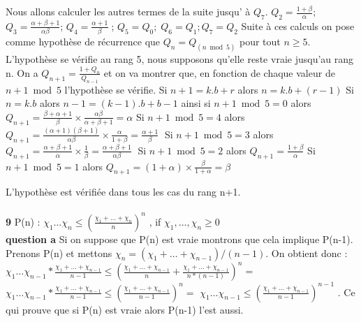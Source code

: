 \documentclass[9pt]{amsart}
\begin{document}
Nous allons calculer les autres termes de la suite jusqu' \`{a} $Q_{7}$.\newline
$Q_{2} = \frac{1+\beta}{\alpha}$;\; $Q_{3} = \frac{\alpha+\beta+1}{\alpha\beta}$;\; $Q_{4}=\frac{\alpha+1}{\beta}\;$; $Q_{5}= Q_{0};\; Q_{6} = Q_{1}; Q_{7} = Q_{2}$ 
\newline\newline Suite \`{a} ces calculs on pose comme hypoth\`{e}se de r\'{e}currence que $Q_{n} = Q_{(n\bmod5)}$ pour tout $n \geq 5$. L'hypoth\`{e}se se v\'{e}rifie au rang 5, nous supposons qu'elle reste vraie jusqu'au rang n. On a $Q_{n+1} = \frac{1 + Q_{n}}{Q_{n-1}}$ et on va montrer que, en fonction de chaque valeur de $n+1\bmod5$ l'hypoth\`{e}se se v\'{e}rifie. \newline\newline
Si $n+1 = k.b + r$ alors $n = k.b + (r-1)$ \newline
Si $n = k.b$ alors $n-1 = (k-1).b + b - 1$\newline
ainsi si $n+1 \bmod 5 = 0$ alors $Q_{n+1} = \frac{\beta+\alpha+1}{\beta}\times\frac{\alpha\beta}{\alpha+\beta+1} = \alpha$\newline
Si $n+1 \bmod 5 = 4$ alors $Q_{n+1} = \frac{(\alpha+1)(\beta+1)}{\alpha\beta}\times\frac{\alpha}{1 + \beta} = \frac{\alpha+1}{\beta}\;$\newline
Si $n+1 \bmod 5 = 3$ alors  $Q_{n+1} = \frac{\alpha+\beta+1}{\alpha}\times\frac{1}{\beta} = \frac{\alpha+\beta+1}{\alpha\beta}\;$\newline
Si $n+1 \bmod 5 = 2$ alors  $Q_{n+1} = \frac{1+\beta}{\alpha}$\newline
Si $n+1 \bmod 5 = 1$ alors  $Q_{n+1} = (1 + \alpha)\times\frac{\beta}{1+\alpha} = \beta$\newline\newline

L'hypothèse est vérifiée dans tous les cas du rang n+1.\\ \\
\textbf{9} P(n) : $\chi_1\dots\chi_n \leq (\frac{\chi_1+\dots+\chi_n}{n})^n$ , if  $\chi_1,\dots, \chi_n \geq 0$ \\
\textbf{question a}  Si on suppose que P(n) est vraie montrons que cela implique P(n-1). \\
Prenons P(n) et mettons $\chi_n = (\chi_1+\dots+\chi_{n-1})/(n-1)$. On obtient donc : \\
$\chi_1\dots\chi_{n-1}*\frac{\chi_1+\dots+\chi_{n-1}}{n-1} \leq (\frac{\chi_1+\dots+\chi_{n-1}}{n}+\frac{\chi_1+\dots+\chi_{n-1}}{n*(n-1)})^n = $ \\ 
$\chi_1\dots\chi_{n-1}*\frac{\chi_1+\dots+\chi_{n-1}}{n-1} \leq (\frac{\chi_1+\dots+\chi_{n-1}}{n-1})^n = $
$\chi_1\dots\chi_{n-1} \leq (\frac{\chi_1+\dots+\chi_{n-1}}{n-1})^{n-1}$ . Ce qui prouve que si P(n) est vraie alors P(n-1) l'est aussi. \\
\end{document}
